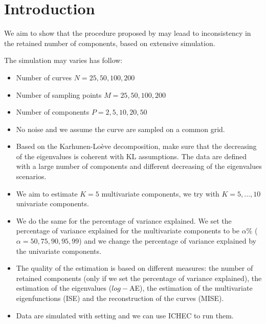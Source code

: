 \section{Introduction} %
\label{sec:introduction}

We aim to show that the procedure proposed by \cite{happMultivariateFunctionalPrincipal2018a} may leaad to inconsistency in the retained number of components, based on extensive simulation.

The simulation may varies has follow:
\begin{itemize}
    \item Number of curves $N = 25, 50, 100, 200$
    \item Number of sampling points $M = 25, 50, 100, 200$
    \item Number of components $P = 2, 5, 10, 20, 50$
    \item No noise and we assume the curve are sampled on a common grid.
    \item Based on the Karhunen-Loève decomposition, make sure that the decreasing of the eigenvalues is coherent with KL assumptions. The data are defined with a large number of components and different decreasing of the eigenvalues scenarios.
    \item We aim to estimate $K = 5$ multivariate components, we try with $K = 5,..., 10$ univariate components.
    \item We do the same for the percentage of variance explained. We set the percentage of variance explained for the multivariate components to be $\alpha\%$ ($\alpha = 50, 75, 90, 95, 99$) and we change the percentage of variance explained by the univariate components.
    \item The quality of the estimation is based on different measures: the number of retained components (only if we set the percentage of variance explained), the estimation of the eigenvalues ($log-$AE), the estimation of the multivariate eigenfunctions (ISE) and the reconstruction of the curves (MISE).
    \item Data are simulated with \cite{happMultivariateFunctionalPrincipal2018a} setting and we can use ICHEC to run them.
\end{itemize}
